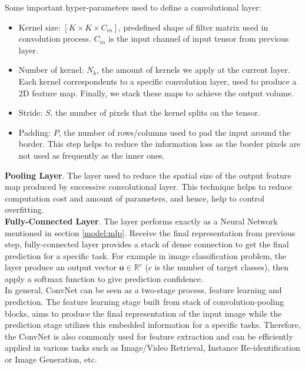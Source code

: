 Some important hyper-parameters used to define a convolutional layer:
\begin{itemize}
    \item Kernel size: $[K \times K \times C_{in}]$, predefined shape of filter matrix used in convolution process. $C_{in}$ is the input channel of input tensor from previous layer.
    \item Number of kernel: $N_{k}$, the amount of kernels we apply at the current layer. Each kernel correspondents to a specific convolution layer, used to produce a 2D feature map. Finally, we stack these maps to achieve the output volume.
    \item Stride: $S$, the number of pixels that the kernel splits on the tensor.
    \item Padding: $P$, the number of rows/columns used to pad the input around the border. This step helps to reduce the information loss as the border pixels are not used as frequently as the inner ones.    
\end{itemize}
\textbf{Pooling Layer}. \quad The layer used to reduce the spatial size of the output feature map produced by successive convolutional layer. This technique helps to reduce computation cost and amount of parameters, and hence, help to control overfitting. \\
\textbf{Fully-Connected Layer}. \quad The layer performs exactly as a Neural Network mentioned in section \ref{model:mlp}. Receive the final representation from previous step, fully-connected layer provides a stack of dense connection to get the final prediction for a specific task. For example in image classification problem, the layer produce an output vector $\mathbf{o} \in \mathbb{R}^{c}$ ($c$ is the number of target classes), then apply a softmax function to give prediction confidence. \\
In general, ConvNet can be seen as a two-stage process, feature learning and prediction. The feature learning stage built from stack of convolution-pooling blocks, aims to produce the final representation of the input image while the prediction stage utilizes this embedded information for a specific tasks.
Therefore, the ConvNet is also commonly used for feature extraction and can be efficiently applied in various tasks such as Image/Video Retrieval, Instance Re-identification or Image Generation, etc. 

